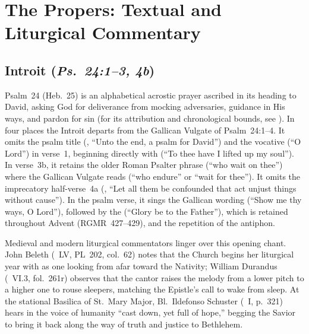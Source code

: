 \section{The Propers: Textual and Liturgical Commentary}

\subsection{Introit (\textit{Ps.~24:1--3, 4b})}

Psalm~24 (Heb.~25) is an alphabetical acrostic prayer ascribed in its heading to David, asking God for deliverance from mocking adversaries, guidance in His ways, and pardon for sin (for its attribution and chronological bounds, see \hyperref[sec:date-location]{}). In four places the Introit departs from the Gallican Vulgate of Psalm~24:1--4. It omits the psalm title (, ``Unto the end, a psalm for David'') and the vocative  (``O Lord'') in verse~1, beginning directly with  (``To thee have I lifted up my soul''). In verse~3b, it retains the older Roman Psalter phrase  (``who wait on thee'') where the Gallican Vulgate reads  (``who endure'' or ``wait for thee''). It omits the imprecatory half-verse~4a (, ``Let all them be confounded that act unjust things without cause''). In the psalm verse, it sings the Gallican wording  (``Show me thy ways, O Lord''), followed by the  (``Glory be to the Father''), which is retained throughout Advent (RGMR~427--429), and the repetition of the antiphon.

Medieval and modern liturgical commentators linger over this opening chant. John Beleth (~LV, PL~202, col.~62) notes that the Church begins her liturgical year with  as one looking from afar toward the Nativity; William Durandus (~VI.3, fol.~261r) observes that the cantor raises the melody from a lower pitch to a higher one to rouse sleepers, matching the Epistle's call to wake from sleep. At the stational Basilica of St.~Mary Major, Bl.~Ildefonso Schuster (~I, p.~321) hears in  the voice of humanity ``cast down, yet full of hope,'' begging the Savior to bring it back along the way of truth and justice to Bethlehem.


